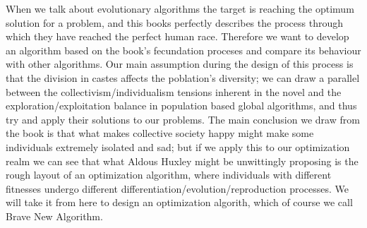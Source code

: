 When we talk about evolutionary algorithms the target is reaching the
optimum solution for a problem, and this books perfectly describes
the process through which they have reached the perfect human
race. Therefore we want to develop an algorithm based on the book's
fecundation proceses and compare its behaviour with other
algorithms. Our main assumption during the design of this process is
that the division in castes affects the
poblation's diversity; we can draw a parallel between the
collectivism/individualism tensions inherent in the novel and the
exploration/exploitation balance in population based global
algorithms, and thus try and apply their solutions to our
problems. The main conclusion we draw from the book is that what makes
collective society happy might make some individuals extremely
isolated and sad; but if we apply this to our optimization realm we
can see that what Aldous Huxley might be unwittingly proposing is the
rough layout of an optimization algorithm, where individuals with
different fitnesses undergo different
differentiation/evolution/reproduction processes. We will take it from
here to design an optimization algorith, which of course we call Brave
New Algorithm.


